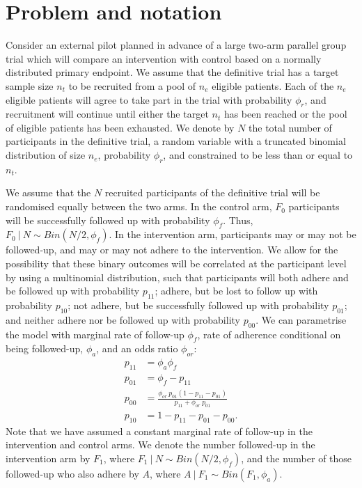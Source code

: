 \documentclass[AMA,STIX1COL]{WileyNJD-v2}
\begin{document}

\section{Problem and notation}\label{sec:problem}

Consider an external pilot planned in advance of a large two-arm parallel group trial which will compare an intervention with control based on a normally distributed primary endpoint. We assume that the definitive trial has a target sample size $n_t$ to be recruited from a pool of $n_e$ eligible patients. Each of the $n_e$ eligible patients will agree to take part in the trial with probability $\phi_r$, and recruitment will continue until either the target $n_t$ has been reached or the pool of eligible patients has been exhausted. We denote by $N$ the total number of participants in the definitive trial, a random variable with a truncated binomial distribution of size $n_e$, probability $\phi_r$, and constrained to be less than or equal to $n_t$.

We assume that the $N$ recruited participants of the definitive trial will be randomised equally between the two arms. In the control arm, $F_0$ participants will be successfully followed up with probability $\phi_f$. Thus, $F_0 ~|~ N \sim Bin(N/2, \phi_f)$. In the intervention arm, participants may or may not be followed-up, and may or may not adhere to the intervention. We allow for the possibility that these binary outcomes will be correlated at the participant level by using a multinomial distribution, such that participants will both adhere and be followed up with probability $p_{11}$; adhere, but be lost to follow up with probability $p_{10}$; not adhere, but be successfully followed up with probability $p_{01}$; and neither adhere nor be followed up with probability $p_{00}$. We can parametrise the model with marginal rate of follow-up $\phi_f$, rate of adherence conditional on being followed-up, $\phi_a$, and an odds ratio $\phi_{or}$:
\begin{align*}
p_{11} &= \phi_a \phi_f \\
p_{01} &= \phi_f - p_{11} \\
p_{00} &= \frac{\phi_{or} ~ p_{01}(1-p_{11}-p_{01})}{p_{11} + \phi_{or} ~ p_{01}} \\
p_{10} &= 1 - p_{11} - p_{01} - p_{00}.
\end{align*}
Note that we have assumed a constant marginal rate of follow-up in the intervention and control arms. We denote the number followed-up in the intervention arm by $F_1$, where $F_1 ~|~ N\sim Bin(N/2, \phi_f)$, and the number of those followed-up who also adhere by $A$, where $A ~|~ F_1 \sim Bin(F_1, \phi_a)$. 
\end{document}
